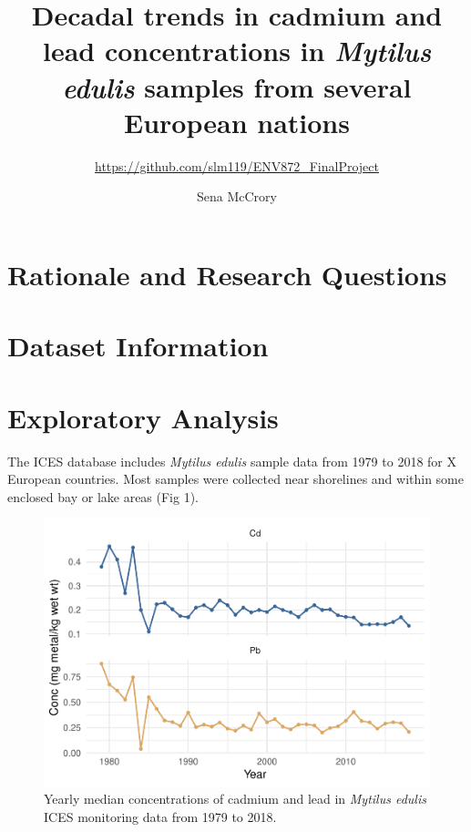 \documentclass[
  12pt,
]{article}
\title{Decadal trends in cadmium and lead concentrations in \emph{Mytilus
edulis} samples from several European nations}
\subtitle{\url{https://github.com/slm119/ENV872_FinalProject}}
\author{Sena McCrory}
\date{}
\begin{document}
\maketitle

\newpage
\tableofcontents 
\newpage
\listoftables 
\newpage
\listoffigures 
\newpage

\hypertarget{rationale-and-research-questions}{%
\section{Rationale and Research
Questions}\label{rationale-and-research-questions}}

\newpage

\hypertarget{dataset-information}{%
\section{Dataset Information}\label{dataset-information}}

\newpage

\hypertarget{exploratory-analysis}{%
\section{Exploratory Analysis}\label{exploratory-analysis}}

The ICES database includes \emph{Mytilus edulis} sample data from 1979
to 2018 for X European countries. Most samples were collected near
shorelines and within some enclosed bay or lake areas (Fig 1).

\begin{figure}
\centering
\includegraphics{McCrory_ENV972_Project_files/figure-latex/unnamed-chunk-1-1.pdf}
\caption{Yearly median concentrations of cadmium and lead in
\emph{Mytilus edulis} ICES monitoring data from 1979 to 2018.}
\end{figure}
\end{document}
